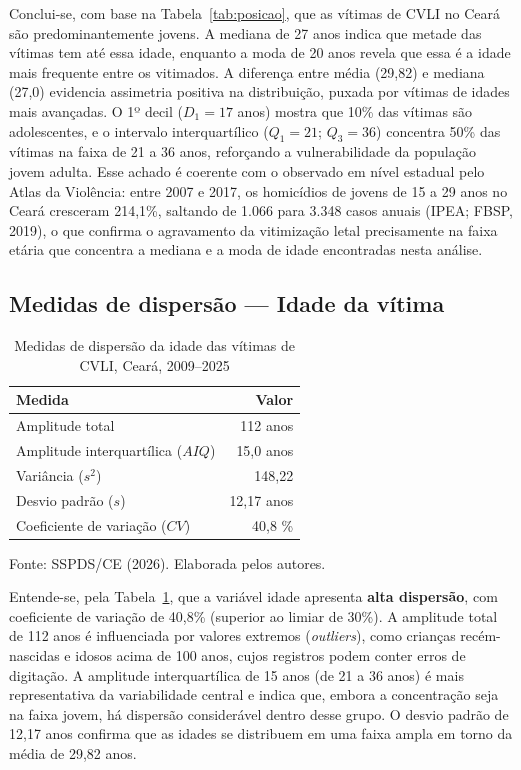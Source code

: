 \documentclass[12pt,a4paper]{article}
\newcommand{\fonte}[1]{  \vspace{-2mm}
  \begin{center}\footnotesize Fonte: #1\end{center}
}
\begin{document}
Conclui-se, com base na Tabela~\ref{tab:posicao}, que as vítimas de CVLI no Ceará são predominantemente jovens. A mediana de 27 anos indica que metade das vítimas tem até essa idade, enquanto a moda de 20 anos revela que essa é a idade mais frequente entre os vitimados. A diferença entre média (29,82) e mediana (27,0) evidencia assimetria positiva na distribuição, puxada por vítimas de idades mais avançadas. O 1º decil ($D_1 = 17$ anos) mostra que 10\% das vítimas são adolescentes, e o intervalo interquartílico ($Q_1 = 21$; $Q_3 = 36$) concentra 50\% das vítimas na faixa de 21 a 36 anos, reforçando a vulnerabilidade da população jovem adulta. Esse achado é coerente com o observado em nível estadual pelo Atlas da Violência: entre 2007 e 2017, os homicídios de jovens de 15 a 29 anos no Ceará cresceram 214,1\%, saltando de 1.066 para 3.348 casos anuais (IPEA; FBSP, 2019), o que confirma o agravamento da vitimização letal precisamente na faixa etária que concentra a mediana e a moda de idade encontradas nesta análise.

\subsection{Medidas de dispersão --- Idade da vítima}

\begin{table}[H]
\centering
\caption{Medidas de dispersão da idade das vítimas de CVLI, Ceará, 2009--2025}
\label{tab:dispersao}
\begin{tabular}{lr}
\toprule
\textbf{Medida} & \textbf{Valor} \\
\midrule
Amplitude total                     & 112 anos \\
Amplitude interquartílica ($AIQ$)   & 15,0 anos \\
Variância ($s^2$)                   & 148,22 \\
Desvio padrão ($s$)                 & 12,17 anos \\
Coeficiente de variação ($CV$)      & 40,8 \% \\
\bottomrule
\end{tabular}
\end{table}
\fonte{SSPDS/CE (2026). Elaborada pelos autores.}

Entende-se, pela Tabela~\ref{tab:dispersao}, que a variável idade apresenta \textbf{alta dispersão}, com coeficiente de variação de 40,8\% (superior ao limiar de 30\%). A amplitude total de 112 anos é influenciada por valores extremos (\textit{outliers}), como crianças recém-nascidas e idosos acima de 100 anos, cujos registros podem conter erros de digitação. A amplitude interquartílica de 15 anos (de 21 a 36 anos) é mais representativa da variabilidade central e indica que, embora a concentração seja na faixa jovem, há dispersão considerável dentro desse grupo. O desvio padrão de 12,17 anos confirma que as idades se distribuem em uma faixa ampla em torno da média de 29,82 anos.
\end{document}
